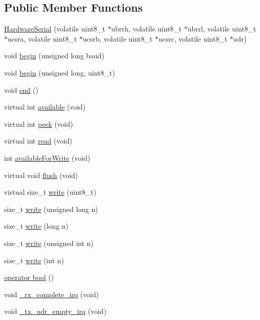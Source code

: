 \subsection*{Public Member Functions}
\begin{DoxyCompactItemize}
\item 
\hyperlink{class_hardware_serial_ab181fe0181fb1fc198b33af34ee13cb4}{Hardware\+Serial} (volatile uint8\+\_\+t $\ast$ubrrh, volatile uint8\+\_\+t $\ast$ubrrl, volatile uint8\+\_\+t $\ast$ucsra, volatile uint8\+\_\+t $\ast$ucsrb, volatile uint8\+\_\+t $\ast$ucsrc, volatile uint8\+\_\+t $\ast$udr)
\item 
void \hyperlink{class_hardware_serial_a384e10dd459783bcba27090520119f3c}{begin} (unsigned long baud)
\item 
void \hyperlink{class_hardware_serial_a6d7cd41eca940345e2ffad77cf08c3bc}{begin} (unsigned long, uint8\+\_\+t)
\item 
void \hyperlink{class_hardware_serial_aaf81d3fdaf258088d7692fa70cece087}{end} ()
\item 
virtual int \hyperlink{class_hardware_serial_aeec8f4dbef97221a6041d6cdc6e9b716}{available} (void)
\item 
virtual int \hyperlink{class_hardware_serial_a65e3a688fcd31f2f486d3af02c400d8f}{peek} (void)
\item 
virtual int \hyperlink{class_hardware_serial_aead319e2866cf90d56c10f2ed39a4396}{read} (void)
\item 
int \hyperlink{class_hardware_serial_a4afe5933dbdb0ad962857d00e04c3bfc}{available\+For\+Write} (void)
\item 
virtual void \hyperlink{class_hardware_serial_a0a4efd3d0f68d057f23eb5dfcd16c17c}{flush} (void)
\item 
virtual size\+\_\+t \hyperlink{class_hardware_serial_a0c15a57daf1517586523b8d270d34c7d}{write} (uint8\+\_\+t)
\item 
size\+\_\+t \hyperlink{class_hardware_serial_a0ba52a995edf9b6c2cdf3d396be84ff1}{write} (unsigned long n)
\item 
size\+\_\+t \hyperlink{class_hardware_serial_a3cfec102ee6f58a2f7e617999ce9f5bb}{write} (long n)
\item 
size\+\_\+t \hyperlink{class_hardware_serial_a2d9bc6ac05e45a7023be3cd1ca224407}{write} (unsigned int n)
\item 
size\+\_\+t \hyperlink{class_hardware_serial_a22e7ab55e0aa268cff5b48e763429ec3}{write} (int n)
\item 
\hyperlink{class_hardware_serial_a9b3baad8c612d81b96e46f84d7e97580}{operator bool} ()
\item 
void \hyperlink{class_hardware_serial_a1e53ef70365848217cf98758e9391ca1}{\+\_\+rx\+\_\+complete\+\_\+irq} (void)
\item 
void \hyperlink{class_hardware_serial_aa3d3b6e82dac8974a0a70c3abf301e70}{\+\_\+tx\+\_\+udr\+\_\+empty\+\_\+irq} (void)
\end{DoxyCompactItemize}
